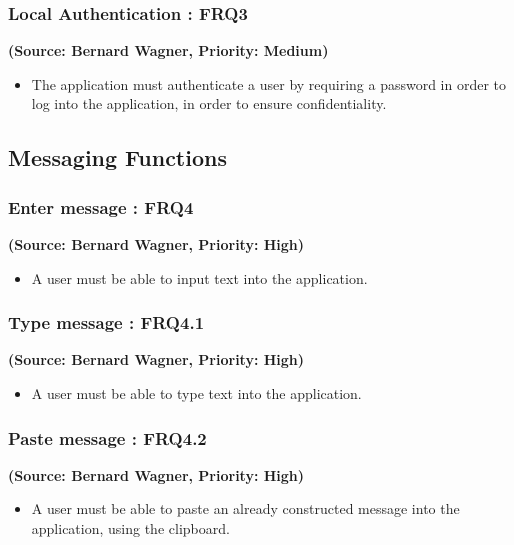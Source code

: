 \subsubsection{Local Authentication : FRQ3}%
\textbf{(Source: Bernard Wagner, Priority: Medium)}
\begin{itemize}
\item The application must authenticate a user by requiring a password in order to log into the application, in order to ensure confidentiality.
\end{itemize}

\subsection{Messaging Functions}

\subsubsection{Enter message : FRQ4}%
\textbf{(Source: Bernard Wagner, Priority: High)}
\begin{itemize}
\item A user must be able to input text into the application.
\end{itemize}
\subsubsection{Type message : FRQ4.1}
\textbf{(Source: Bernard Wagner, Priority: High)}
\begin{itemize}
\item A user must be able to type text into the application.
\end{itemize}
\subsubsection{Paste message : FRQ4.2}
\textbf{(Source: Bernard Wagner, Priority: High)}
\begin{itemize}
\item A user must be able to paste an already constructed message into the application, using the clipboard.
\end{itemize}

